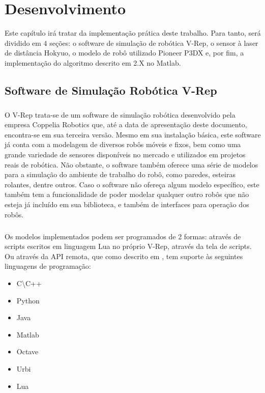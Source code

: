 \chapter{Desenvolvimento}
Este capítulo irá tratar da implementação prática deste trabalho. Para tanto, será dividido em 4 seções: o software de simulação de robótica V-Rep, o sensor \`{a} laser de distância Hokyuo, o modelo de robô utilizado Pioneer P3DX e, por fim, a implementação do algoritmo descrito em 2.X no Matlab.

\section{Software de Simulação Robótica V-Rep}
\paragraph{}
O V-Rep trata-se de um software de simulação robótica desenvolvido pela empresa Coppelia Robotics que, at\'{e} a data de apresentação deste documento, encontra-se em sua terceira versão. Mesmo em sua instalação básica, este software j\'{a} conta com a modelagem de diversos robôs móveis e fixos, bem como uma grande variedade de sensores disponíveis no mercado e utilizados em projetos reais de robótica. N\~{a}o obstante, o software também oferece uma série de modelos para a simulação do ambiente de trabalho do robô, como paredes, esteiras rolantes, dentre outros. Caso o software não ofereça algum modelo específico, este também tem a funcionalidade de poder modelar qualquer outro robôs que não esteja já incluído em sua biblioteca, e também de interfaces para operação dos robôs.

\paragraph{}
Os modelos implementados podem ser programados de 2 formas: através de scripts escritos em linguagem Lua no próprio V-Rep, através da tela de scripts. Ou através da API remota, que como descrito em \cite{copelia1}, tem suporte às seguintes linguagens de programação:
\begin{itemize}
	\item C\textbackslash C++
	\item Python
	\item Java
	\item Matlab
	\item Octave
	\item Urbi
	\item Lua
\end{itemize}

